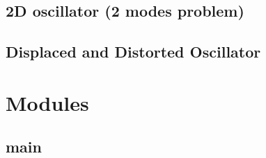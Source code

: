 \documentclass[letterpaper,10pt,english]{sphinxmanual}
\begin{document}
\section{2D oscillator (2 modes problem)}
\label{\detokenize{input:d-oscillator-2-modes-problem}}



\section{Displaced and Distorted Oscillator}
\label{\detokenize{input:displaced-and-distorted-oscillator}}



\chapter{Modules}
\label{\detokenize{modules/index:modules}}\label{\detokenize{modules/index::doc}}

\section{main}
\label{\detokenize{modules/main:module-phlab}}\label{\detokenize{modules/main:main}}\label{\detokenize{modules/main::doc}}
\end{document}
